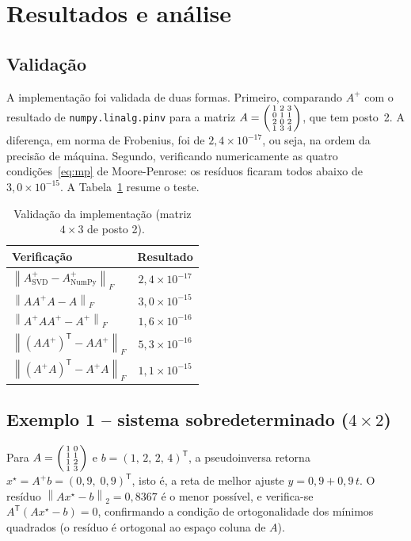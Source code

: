 \documentclass[12pt,a4paper,oneside]{report}
\newcommand{\norm}[1]{\left\lVert #1 \right\rVert}
\newcommand{\T}{^{\mathsf{T}}}
\newcommand{\Ap}{A^{+}}
\begin{document}
\section{Resultados e análise}

\subsection{Validação}

A implementação foi validada de duas formas. Primeiro, comparando $\Ap$ com o
resultado de \texttt{numpy.linalg.pinv} para a matriz
$A=\begin{psmallmatrix}1&2&3\\0&1&1\\2&0&2\\1&3&4\end{psmallmatrix}$, que tem posto~2. A diferença, em norma de Frobenius, foi de
$2{,}4\times 10^{-17}$, ou seja, na ordem da precisão de máquina. Segundo, verificando
numericamente as quatro condições~\eqref{eq:mp} de Moore-Penrose: os resíduos ficaram todos abaixo de $3{,}0\times10^{-15}$. A Tabela~\ref{tab:val} resume o teste.

\begin{table}[htbp]
\centering\small
\caption{Validação da implementação (matriz $4\times3$ de posto 2).}
\label{tab:val}
\begin{tabular}{lc}
\toprule
\textbf{Verificação} & \textbf{Resultado} \\
\midrule
$\norm{\Ap_{\text{SVD}} - \Ap_{\text{NumPy}}}_F$ & $2{,}4\times 10^{-17}$ \\
$\norm{A\Ap A-A}_F$            & $3{,}0\times10^{-15}$ \\
$\norm{\Ap A \Ap-\Ap}_F$       & $1{,}6\times10^{-16}$ \\
$\norm{(A\Ap)\T-A\Ap}_F$       & $5{,}3\times10^{-16}$ \\
$\norm{(\Ap A)\T-\Ap A}_F$     & $1{,}1\times10^{-15}$ \\
\bottomrule
\end{tabular}
\end{table}

\subsection{\texorpdfstring{Exemplo 1 -- sistema sobredeterminado ($4\times2$)}{Exemplo 1 -- sistema sobredeterminado (4x2)}}

Para $A=\begin{psmallmatrix}1&0\\1&1\\1&2\\1&3\end{psmallmatrix}$ e
$b = (1,\,2,\,2,\,4)\T$, a pseudoinversa retorna
$x^\star = \Ap b = (0{,}9,\;0{,}9)\T$, isto é, a reta de melhor ajuste
$y = 0{,}9 + 0{,}9\,t$. O resíduo $\norm{Ax^\star - b}_2 = 0{,}8367$ é o menor possível, e
verifica-se $A\T(Ax^\star - b) = 0$, confirmando a condição de ortogonalidade dos mínimos
quadrados (o resíduo é ortogonal ao espaço coluna de $A$).
\end{document}
